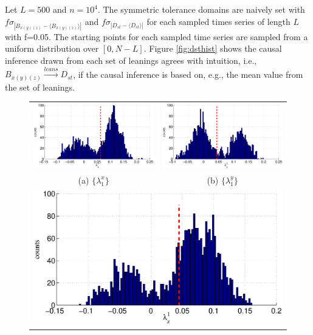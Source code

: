 \documentclass[a4paper,11pt,twocolumn]{article}
\begin{document}
Let $L=500$ and $n=10^4$.  The symmetric tolerance domains are naively set with $f\sigma_{|B_{x(y)(z)}-\langle B_{x(y)(z)}\rangle|}$ and $f\sigma_{|D_{st}-\langle D_{st}\rangle|}$ for each sampled times series of length $L$ with f=0.05.  The starting points for each sampled time series are sampled from a uniform distribution over $[0,N-L]$.  Figure \ref{fig:dsthist} shows the causal inference drawn from each set of leanings agrees with intuition, i.e., $B_{x(y)(z)}\xrightarrow{leans}D_{st}$, if the causal inference is based on, e.g., the mean value from the set of leanings.  
\begin{figure}[ht]
\begin{tabular}{cc}
\includegraphics[scale=0.40]{SolarDataBxDst.eps} & \includegraphics[scale=0.40]{SolarDataByDst.eps} \\
(a) $\{\lambda_1^{x}\}$ & (b) $\{\lambda_1^{y}\}$ \\
\multicolumn{2}{c}{\includegraphics[scale=0.40]{SolarDataBzDst.eps}} \\

\end{tabular}
\end{figure}
\end{document}
